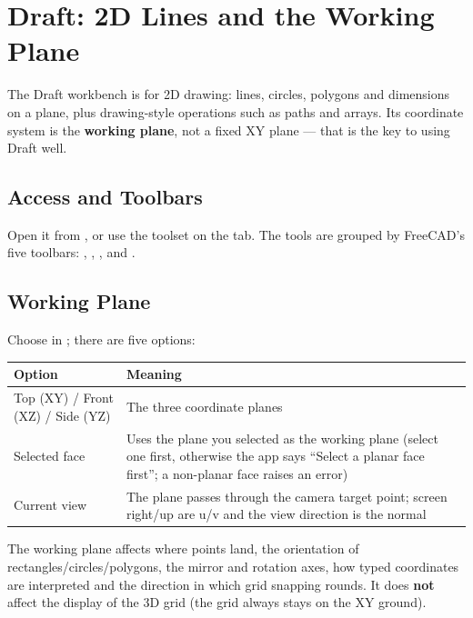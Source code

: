 \chapter{Draft: 2D Lines and the Working Plane}

The Draft workbench is for 2D drawing: lines, circles, polygons and dimensions on a plane, plus
drawing-style operations such as paths and arrays. Its coordinate system is the \textbf{working
plane}, not a fixed XY plane — that is the key to using Draft well.

\section{Access and Toolbars}

Open it from , or use the  toolset on the  tab. The
tools are grouped by FreeCAD's five toolbars: , , ,
 and .

\section{Working Plane}

Choose  in ; there are five options:

\begin{center}
\small
\begin{tabularx}{\linewidth}{@{}lX@{}}
\toprule
\textbf{Option} & \textbf{Meaning} \\
\midrule
Top (XY) / Front (XZ) / Side (YZ) & The three coordinate planes \\
Selected face & Uses the plane you selected as the working plane (select one first, otherwise the app says ``Select a planar face first''; a non-planar face raises an error)\\
Current view & The plane passes through the camera target point; screen right/up are u/v and the view direction is the normal \\
\bottomrule
\end{tabularx}
\end{center}

The working plane affects where points land, the orientation of rectangles/circles/polygons, the
mirror and rotation axes, how typed coordinates are interpreted and the direction in which grid
snapping rounds. It does \textbf{not} affect the display of the 3D grid (the grid always stays on
the XY ground).

